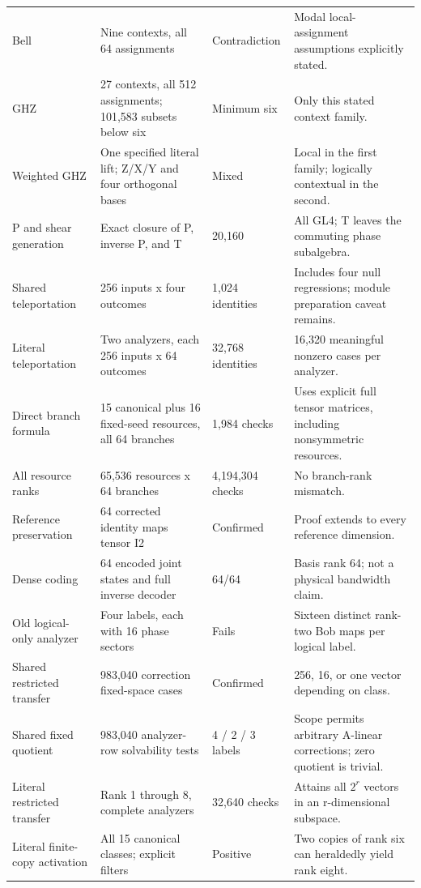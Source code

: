\documentclass[11pt,a4paper]{article}
\theoremstyle{definition}\newtheorem{definition}[theorem]{Definition}
\begin{document}
\begin{longtable}{@{}L{29mm}L{53mm}L{21mm}L{45mm}@{}}
Bell & Nine contexts, all 64 assignments & Contradiction & Modal local-assignment assumptions explicitly stated.\\
GHZ & 27 contexts, all 512 assignments; 101,583 subsets below six & Minimum six & Only this stated context family.\\
Weighted GHZ & One specified literal lift; Z/X/Y and four orthogonal bases & Mixed & Local in the first family; logically contextual in the second.\\
P and shear generation & Exact closure of P, inverse P, and T & 20,160 & All GL4; T leaves the commuting phase subalgebra.\\
Shared teleportation & 256 inputs x four outcomes & 1,024 identities & Includes four null regressions; module preparation caveat remains.\\
Literal teleportation & Two analyzers, each 256 inputs x 64 outcomes & 32,768 identities & 16,320 meaningful nonzero cases per analyzer.\\
Direct branch formula & 15 canonical plus 16 fixed-seed resources, all 64 branches & 1,984 checks & Uses explicit full tensor matrices, including nonsymmetric resources.\\
All resource ranks & 65,536 resources x 64 branches & 4,194,304 checks & No branch-rank mismatch.\\
Reference preservation & 64 corrected identity maps tensor I2 & Confirmed & Proof extends to every reference dimension.\\
Dense coding & 64 encoded joint states and full inverse decoder & 64/64 & Basis rank 64; not a physical bandwidth claim.\\
Old logical-only analyzer & Four labels, each with 16 phase sectors & Fails & Sixteen distinct rank-two Bob maps per logical label.\\
Shared restricted transfer & 983,040 correction fixed-space cases & Confirmed & 256, 16, or one vector depending on class.\\
Shared fixed quotient & 983,040 analyzer-row solvability tests & 4 / 2 / 3 labels & Scope permits arbitrary A-linear corrections; zero quotient is trivial.\\
Literal restricted transfer & Rank 1 through 8, complete analyzers & 32,640 checks & Attains all $2^r$ vectors in an r-dimensional subspace.\\
Literal finite-copy activation & All 15 canonical classes; explicit filters & Positive & Two copies of rank six can heraldedly yield rank eight.\\

\end{longtable}
\end{document}
